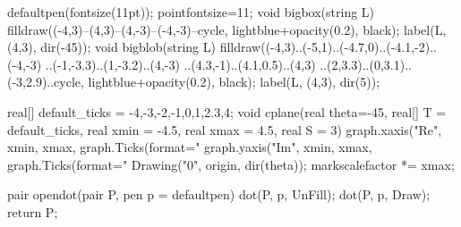 \usepackage{answers}
\renewcommand{\solutionextension}{out}
\renewenvironment{answeritem}[1]{\item[\bf #1.]}{}

\reversemarginpar
\newcommand{\prechili}{\vspace*{0.3em}\hspace*{1.5em}}
\newcommand{\nochili}{\hspace*{1.5em}}
\newcommand{\chili}{\texttt{[image: media/chili.png]}}
\newcommand{\gim}{\marginpar{\prechili\nochili\nochili\chili}}
\newcommand{\yod}{\marginpar{\prechili\nochili\chili\chili}}
\newcommand{\kurumi}{\marginpar{\prechili\chili\chili\chili}}

\makeatletter
\usepackage{etoolbox}
%
\makeatother

\renewcommand{\theasy}{\thechapter\Alph{asy}}
\begin{asydef}
	defaultpen(fontsize(11pt));
	pointfontsize=11;
	void bigbox(string L) {
		filldraw((-4,3)--(4,3)--(4,-3)--(-4,-3)--cycle,
			lightblue+opacity(0.2), black);
		label(L, (4,3), dir(-45));
	}
	void bigblob(string L) {
		filldraw((-4,3)..(-5,1)..(-4.7,0)..(-4.1,-2)..(-4,-3)
			..(-1,-3.3)..(1,-3.2)..(4,-3)
			..(4.3,-1)..(4.1,0.5)..(4,3)
			..(2,3.3)..(0,3.1)..(-3,2.9)..cycle,
			lightblue+opacity(0.2), black);
		label(L, (4,3), dir(5));
	}

	real[] default_ticks = {-4,-3,-2,-1,0,1,2.3,4};
	void cplane(real theta=-45, real[] T = default_ticks, real xmin = -4.5, real xmax = 4.5, real S = 3) {
		graph.xaxis("Re", xmin, xmax, graph.Ticks(format="%
		graph.yaxis("Im", xmin, xmax, graph.Ticks(format="%
		Drawing("0", origin, dir(theta));
		markscalefactor *= xmax;
	}

	pair opendot(pair P, pen p = defaultpen) {
		dot(P, p, UnFill);
		dot(P, p, Draw);
		return P;
	}
\end{asydef}
\def\asydir{asy}

\usepackage[backend=biber,style=alphabetic]{biblatex}




